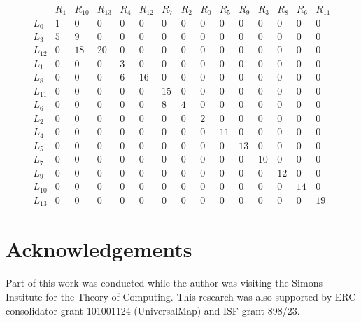 \documentclass[11pt]{article}
\theoremstyle{remark}
\begin{document}
\[
\begin{array}{c|cccccccccccccc}
 & R_1 & R_{10} & R_{13} & R_4 & R_{12} & R_7 & R_2
 & R_0 & R_5 & R_9 & R_3 & R_8 & R_6 & R_{11} \\ \hline
L_0    & 1 & 0  & 0  & 0  & 0  & 0  & 0 & 0 & 0 & 0 & 0 & 0 & 0 & 0 \\
L_3    & 5 & 9  & 0  & 0  & 0  & 0  & 0 & 0 & 0 & 0 & 0 & 0 & 0 & 0 \\
L_{12} & 0 & 18 & 20 & 0  & 0  & 0  & 0 & 0 & 0 & 0 & 0 & 0 & 0 & 0 \\
L_1    & 0 & 0  & 0  & 3  & 0  & 0  & 0 & 0 & 0 & 0 & 0 & 0 & 0 & 0 \\
L_8    & 0 & 0  & 0  & 6  & 16 & 0  & 0 & 0 & 0 & 0 & 0 & 0 & 0 & 0 \\
L_{11} & 0 & 0  & 0  & 0  & 0  & 15 & 0 & 0 & 0 & 0 & 0 & 0 & 0 & 0 \\
L_6    & 0 & 0  & 0  & 0  & 0  & 8  & 4 & 0 & 0 & 0 & 0 & 0 & 0 & 0 \\
L_2    & 0 & 0  & 0  & 0  & 0  & 0  & 0 & 2 & 0 & 0 & 0 & 0 & 0 & 0 \\
L_4    & 0 & 0  & 0  & 0  & 0  & 0  & 0 & 0 & 11& 0 & 0 & 0 & 0 & 0 \\
L_5    & 0 & 0  & 0  & 0  & 0  & 0  & 0 & 0 & 0 & 13& 0 & 0 & 0 & 0 \\
L_7    & 0 & 0  & 0  & 0  & 0  & 0  & 0 & 0 & 0 & 0 & 10& 0 & 0 & 0 \\
L_9    & 0 & 0  & 0  & 0  & 0  & 0  & 0 & 0 & 0 & 0 & 0 & 12& 0 & 0 \\
L_{10} & 0 & 0  & 0  & 0  & 0  & 0  & 0 & 0 & 0 & 0 & 0 & 0 & 14& 0 \\
L_{13} & 0 & 0  & 0  & 0  & 0  & 0  & 0 & 0 & 0 & 0 & 0 & 0 & 0 & 19
\end{array}
\]


\section*{Acknowledgements} Part of this work was conducted while the author was visiting the Simons Institute for the Theory of Computing. This research was also supported by ERC consolidator grant 101001124 (UniversalMap) and ISF grant 898/23.










\end{document}
